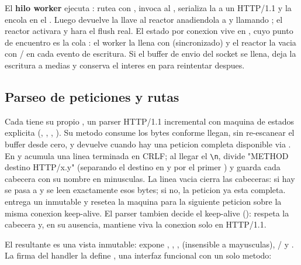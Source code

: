 El \textbf{hilo worker} ejecuta : rutea con ,
invoca al , serializa la  a un  HTTP/1.1
y la encola en el . Luego devuelve la llave al reactor anadiendola a
 y llamando ; el reactor activara
 y  hara el flush real. El estado por conexion vive
en , cuyo punto de encuentro es la cola : el worker la
llena con  (sincronizado) y el reactor la vacia con
/ en cada evento de escritura. Si el buffer
de envio del socket se llena,  deja la escritura a medias y conserva
el interes en  para reintentar despues.

\subsection{Parseo de peticiones y rutas}

Cada  tiene su propio , un parser HTTP/1.1
incremental con maquina de estados explicita (, ,
, ). Su metodo  consume los
bytes conforme llegan, sin re-escanear el buffer desde cero, y devuelve 
cuando hay una peticion completa disponible via . En 
y  acumula una linea terminada en CRLF; al llegar el \verb|\n|,
 divide "METHOD destino HTTP/x.y" (separando el destino en
 y  por el primer ) y  guarda
cada cabecera con su nombre en minusculas. La linea vacia cierra las cabeceras: si hay
 se pasa a  y se leen exactamente esos bytes;
si no, la peticion ya esta completa.  entrega un  inmutable
y resetea la maquina para la siguiente peticion sobre la misma conexion keep-alive. El
parser tambien decide el keep-alive (): respeta la cabecera
 y, en su ausencia, mantiene viva la conexion solo en HTTP/1.1.

El  resultante es una vista inmutable: expone ,
, ,  (insensible a mayusculas),
/ y . La firma del handler la
define , una interfaz funcional con un solo metodo:

